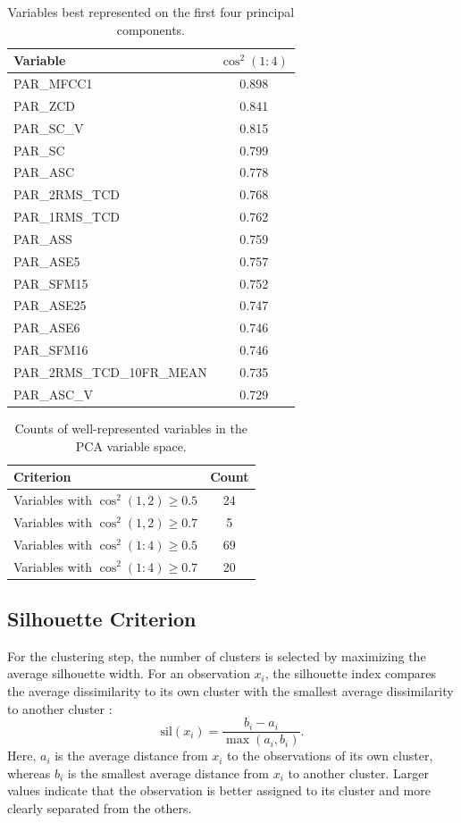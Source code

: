 \begin{table}[H]
\centering
\caption{Variables best represented on the first four principal components.}
\label{tab:pca_best_first4}
\scriptsize
\begin{tabular}{lc}
\toprule
Variable & \(\cos^2(1{:}4)\) \\
\midrule
PAR\_MFCC1 & 0.898 \\
PAR\_ZCD & 0.841 \\
PAR\_SC\_V & 0.815 \\
PAR\_SC & 0.799 \\
PAR\_ASC & 0.778 \\
PAR\_2RMS\_TCD & 0.768 \\
PAR\_1RMS\_TCD & 0.762 \\
PAR\_ASS & 0.759 \\
PAR\_ASE5 & 0.757 \\
PAR\_SFM15 & 0.752 \\
PAR\_ASE25 & 0.747 \\
PAR\_ASE6 & 0.746 \\
PAR\_SFM16 & 0.746 \\
PAR\_2RMS\_TCD\_10FR\_MEAN & 0.735 \\
PAR\_ASC\_V & 0.729 \\
\bottomrule
\end{tabular}
\end{table}

\begin{table}[H]
\centering
\caption{Counts of well-represented variables in the PCA variable space.}
\label{tab:pca_representation_counts}
\scriptsize
\begin{tabular}{lc}
\toprule
Criterion & Count \\
\midrule
Variables with \(\cos^2(1,2)\geq 0.5\) & 24 \\
Variables with \(\cos^2(1,2)\geq 0.7\) & 5 \\
Variables with \(\cos^2(1{:}4)\geq 0.5\) & 69 \\
Variables with \(\cos^2(1{:}4)\geq 0.7\) & 20 \\
\bottomrule
\end{tabular}
\end{table}

\subsection{Silhouette Criterion}
\label{subsec:silhouette}
For the clustering step, the number of clusters is selected by maximizing the average silhouette width. For an observation \(x_i\), the silhouette index compares the average dissimilarity to its own cluster with the smallest average dissimilarity to another cluster \cite{rousseeuw1987}:
\begin{equation}
\mathrm{sil}(x_i)=\frac{b_i-a_i}{\max(a_i,b_i)}.
\label{eq:silhouette}
\end{equation}
Here, \(a_i\) is the average distance from \(x_i\) to the observations of its own cluster, whereas \(b_i\) is the smallest average distance from \(x_i\) to another cluster. Larger values indicate that the observation is better assigned to its cluster and more clearly separated from the others.


